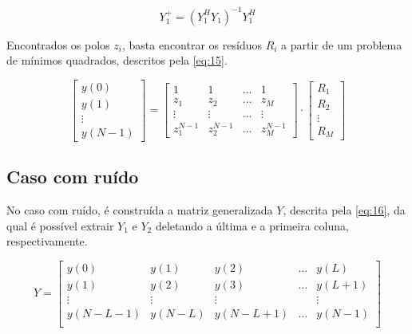 \documentclass[12pt]{article}
\begin{document}
\begin{equation} \label{eq:14}
    Y_1^+= (Y_1^H Y_1)^{-1}Y_1^H
\end{equation}

Encontrados os polos $z_i$, basta encontrar os resíduos $R_i$ a partir de um problema de mínimos quadrados, descritos pela \autoref{eq:15}.

\begin{equation} \label{eq:15}
    \begin{bmatrix} y(0) \\
    y(1) \\
    \vdots \\
    y(N-1)
    \end{bmatrix} = 
    \begin{bmatrix} 1 & 1 & \dots & 1 \\
    z_1 & z_2 & \dots & z_M \\
    \vdots & \vdots & \dots & \vdots \\
    z_1^{N-1} & z_2^{N-1} & \dots & z_M^{N-1}
    \end{bmatrix} \cdot 
    \begin{bmatrix}
    R_1 \\
    R_2 \\
    \vdots \\
    R_{M}
    \end{bmatrix}
\end{equation}

\subsection{Caso com ruído}

No caso com ruído, é construída a matriz generalizada $Y$, descrita pela \autoref{eq:16}, da qual é possível extrair $Y_1$ e $Y_2$ deletando a 
última e a primeira coluna, respectivamente. 

\begin{equation} \label{eq:16}
    Y = \begin{bmatrix} y(0) &y(1) & y(2) & \dots & y(L) \\
                        y(1) & y(2) & y(3) & \dots & y(L + 1) \\
                        \vdots & \vdots & \vdots & & \vdots \\
                        y(N - L -1) & y(N-L) & y(N - L + 1) & \dots & y(N-1) \\
    \end{bmatrix}
\end{equation}
\end{document}
